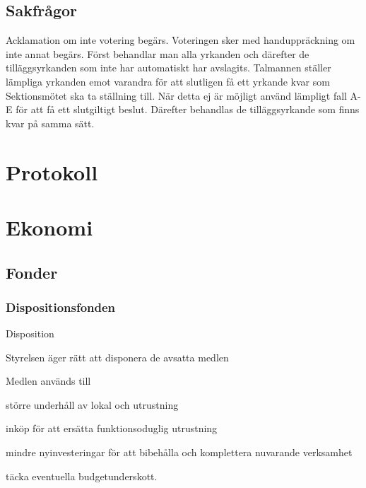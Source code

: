 \documentclass[10pt]{article}
\renewcommand{\thesubsection}{\arabic{section}:\Alph{subsection}}
\begin{document}
\subsection{Sakfrågor}

Acklamation om inte votering begärs. Voteringen sker med handuppräckning om
inte annat begärs. Först behandlar man alla yrkanden och därefter de
tilläggsyrkanden som inte har automatiskt har avslagits. Talmannen ställer
lämpliga yrkanden emot varandra för att slutligen få ett yrkande kvar som
Sektionsmötet ska ta ställning till. När detta ej är möjligt använd lämpligt
fall A-E för att få ett slutgiltigt beslut. Därefter behandlas de
tilläggsyrkande som finns kvar på samma sätt.

\section{Protokoll}

\renewcommand*\thesubsection{\arabic{section}:\arabic{subsection}}
\renewcommand*\thesubsubsection
{\arabic{section}:\arabic{subsection}:\Alph{subsubsection}}
\section{Ekonomi}

\subsection{Fonder}

\subsubsection{Dispositionsfonden}
\begin{emptylist}
\item Disposition
    \begin{dashlist}
    \item Styrelsen äger rätt att disponera de avsatta medlen
    \end{dashlist}
\end{emptylist}
\begin{emptylist}
\item Medlen används till
    \begin{dashlist}
    \item större underhåll av lokal och utrustning
    \item inköp för att ersätta funktionsoduglig utrustning
    \item mindre nyinvesteringar för att bibehålla och komplettera nuvarande
        verksamhet
    \item täcka eventuella budgetunderskott.
    \end{dashlist}
\end{emptylist}
\end{document}
